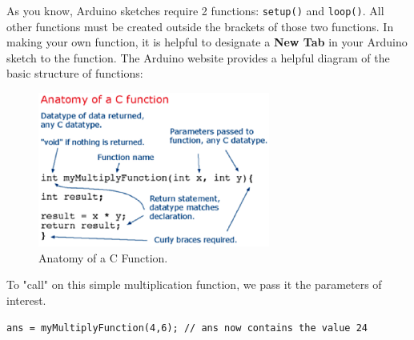 As you know, Arduino sketches require 2 functions: \texttt{setup()} and \texttt{loop()}.  All other functions must be created outside the brackets of those two functions. In making your own function, it is helpful to designate a \textbf{New Tab} in your Arduino sketch to the function. The Arduino website provides a helpful diagram of the basic structure of functions:

\begin{figure}[ht]
	\centering
	\includegraphics[height=2in]{pics/c_function_anatomy.eps}
	\caption{Anatomy of a C Function.}
	\label{c_function_anatomy}
\end{figure}

To "call" on this simple multiplication function, we pass it the parameters of interest.
\par \hspace{4ex} \texttt{ans = myMultiplyFunction(4,6); // ans now contains the value 24}


